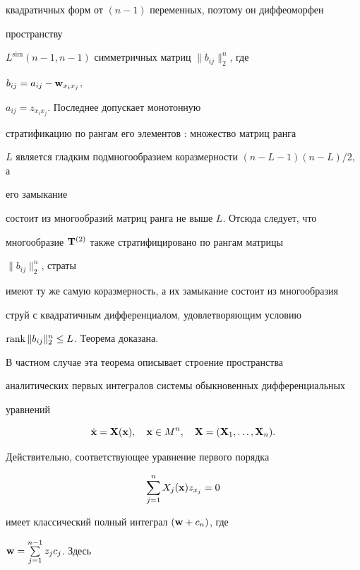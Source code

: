 квадратичных форм от $(n-1)$ переменных, поэтому он диффеоморфен


пространству


$L^{\text{sim}}(n-1,n-1)$ симметричных матриц $\|b_{ij}\|^n_2$, где


$b_{ij}=a_{ij}-\bold w_{x_i x_j}$,


$a_{ij}=z_{x_i x_j}$. Последнее допускает монотонную


стратификацию по рангам его элементов \cite{A6}: множество матриц ранга


$L$ является гладким подмногообразием коразмерности $(n-L-1)(n-L)/2$, а


его замыкание


состоит из многообразий матриц ранга не выше $L$. Отсюда следует, что


многообразие $\bold T^{(2)}$ также стратифицировано по рангам матрицы


$\|b_{ij}\|^n_2$, страты


имеют ту же самую коразмерность, а их замыкание состоит из многообразия


струй с квадратичным дифференциалом, удовлетворяющим условию


$\operatorname{rank}\|b_{ij}\|^n_2\le L$. Теорема доказана.


\medskip





В частном случае эта теорема описывает строение пространства


аналитических первых интегралов системы обыкновенных дифференциальных


уравнений


$$


\Dot{\bold x}=\bold X(\bold x),\quad \bold x\in M^n,\quad


\bold X=(\bold X_1,\dotsc,\bold X_n).


$$





Действительно, соответствующее уравнение первого порядка


\begin{equation}


\sum^n_{j=1}X_j(\bold x)z_{x_j}=0


\end{equation}


имеет классический полный интеграл $(\bold w+c_n)$, где


$\bold w=\sum\limits^{n-1}_{j=1}z_j c_j$. Здесь


